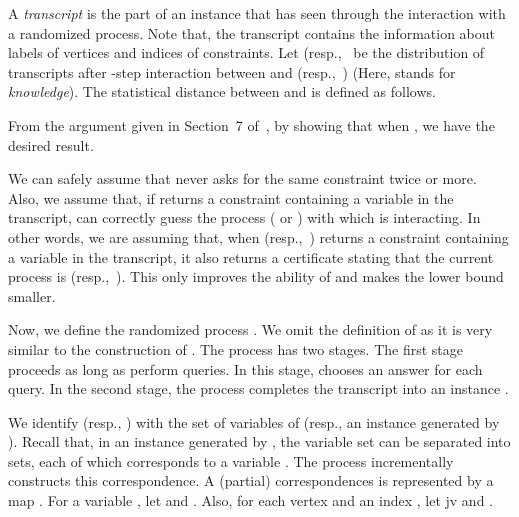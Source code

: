 \documentclass[letterpaper, 11pt]{article}
\begin{document}
A \textit{transcript} is the part of an instance that  has seen through the interaction with a randomized process.
Note that, the transcript contains the information about labels of vertices and indices of constraints.
Let  (resp.,~ be the distribution of transcripts after -step interaction between  and  (resp.,~) (Here,  stands for \textit{knowledge}).
The statistical distance between  and  is defined as follows.

From the argument given in Section~7 of~\cite{GR08},
by showing that  when ,
we have the desired result.

We can safely assume that  never asks for the same constraint twice or more.
Also, we assume that,
if  returns a constraint containing a variable in the transcript,
 can correctly guess the process ( or ) with which  is interacting.
In other words,
we are assuming that, 
when  (resp.,~) returns a constraint containing a variable in the transcript,
it also returns a certificate stating that the current process is  (resp.,~).
This only improves the ability of  and makes the lower bound smaller.

Now, we define the randomized process .
We omit the definition of  as it is very similar to the construction of .
The process  has two stages.
The first stage proceeds as long as  perform queries.
In this stage, 
 chooses an answer for each query.
In the second stage, 
the process completes the transcript into an instance .

We identify  (resp., ) with the set of variables of  (resp., an instance generated by ).
Recall that,
in an instance generated by ,
the variable set  can be separated into  sets,
each of which corresponds to a variable .
The process  incrementally constructs this correspondence.
A (partial) correspondences is represented by a map .
For a variable ,
let  and .
Also, for each vertex  and an index ,
let jv and .
\end{document}
